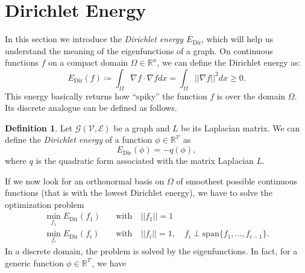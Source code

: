 \documentclass[12pt,a4paper]{report}
\theoremstyle{definition}
\newtheorem{definition}{Definition}[chapter]
\begin{document}
\section{Dirichlet Energy}
\label{sec:dirichlet_energy}

In this section we introduce the \emph{Dirichlet energy $E_{\text{Dir}}$}, which will help us understand the meaning of the eigenfunctions of a graph.
On continuous functions $f$ on a compact domain $\Omega \in \mathbb{R}^n$, we can define the Dirichlet energy as:
\begin{equation*}
    E_{\text{Dir}}(f) \coloneqq
    \int _\Omega  \nabla f \cdot \nabla f dx = 
    \int _\Omega || \nabla f ||^2 dx \geq 0 .
\end{equation*}
This energy basically returns how ``spiky'' the function $f$ is over the domain $\Omega$.
Its discrete analogue can be defined as follows.
\begin{definition}
Let $\mathcal{G}(\mathcal{V}, \mathcal{E})$ be a graph and $L$ be its Laplacian matrix.
We can define the \emph{Dirichlet energy} of a function $\phi \in \mathbb{R}^{\mathcal{V}}$ as
\begin{equation*}
    E_{\text{Dir}}(\phi) = - q( \phi ),
\end{equation*}
where $q$ is the quadratic form associated with the matrix Laplacian $L$.
\end{definition}

If we now look for an orthonormal basis on $\Omega$ of smoothest possible continuous functions (that is with the lowest Dirichlet energy), we have to solve the optimization problem
\begin{align*}
    \min_{f_1} E_{\text{Dir}} (f_1) & \quad \text{with} \quad ||f_1|| = 1 \\
    \min_{f_i} E_{\text{Dir}} (f_i) & \quad \text{with} \quad ||f_i|| = 1, \quad f_i \perp \text{span}\{f_1, \ldots, f_{i-1}\} .
\end{align*}
In a discrete domain, the problem is solved by the eigenfunctions.
In fact, for a generic function $\phi \in \mathbb{R}^\mathcal{V}$, we have
\end{document}
